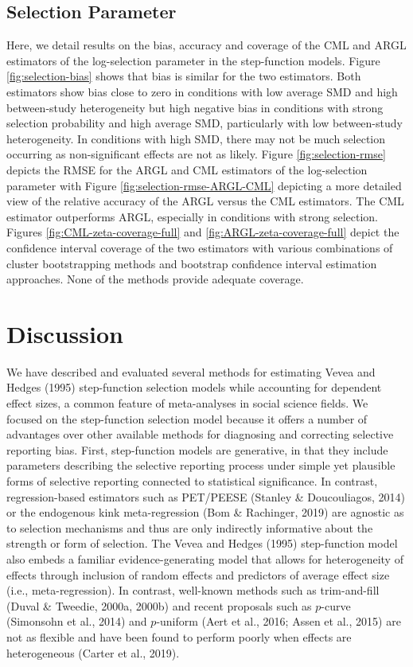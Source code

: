 \documentclass[
  man, donotrepeattitle,floatsintext]{apa7}
\begin{document}
\subsection{Selection Parameter}\label{selection-parameter}

Here, we detail results on the bias, accuracy and coverage of the CML and ARGL estimators of the log-selection parameter in the step-function models. Figure \ref{fig:selection-bias} shows that bias is similar for the two estimators. Both estimators show bias close to zero in conditions with low average SMD and high between-study heterogeneity but high negative bias in conditions with strong selection probability and high average SMD, particularly with low between-study heterogeneity. In conditions with high SMD, there may not be much selection occurring as non-significant effects are not as likely. Figure \ref{fig:selection-rmse} depicts the RMSE for the ARGL and CML estimators of the log-selection parameter with Figure \ref{fig:selection-rmse-ARGL-CML} depicting a more detailed view of the relative accuracy of the ARGL versus the CML estimators. The CML estimator outperforms ARGL, especially in conditions with strong selection. Figures \ref{fig:CML-zeta-coverage-full} and \ref{fig:ARGL-zeta-coverage-full} depict the confidence interval coverage of the two estimators with various combinations of cluster bootstrapping methods and bootstrap confidence interval estimation approaches. None of the methods provide adequate coverage.

\section{Discussion}\label{discussion}

We have described and evaluated several methods for estimating Vevea and Hedges (1995) step-function selection models while accounting for dependent effect sizes, a common feature of meta-analyses in social science fields.
We focused on the step-function selection model because it offers a number of advantages over other available methods for diagnosing and correcting selective reporting bias.
First, step-function models are generative, in that they include parameters describing the selective reporting process under simple yet plausible forms of selective reporting connected to statistical significance.
In contrast, regression-based estimators such as PET/PEESE (Stanley \& Doucouliagos, 2014) or the endogenous kink meta-regression (Bom \& Rachinger, 2019) are agnostic as to selection mechanisms and thus are only indirectly informative about the strength or form of selection.
The Vevea and Hedges (1995) step-function model also embeds a familiar evidence-generating model that allows for heterogeneity of effects through inclusion of random effects and predictors of average effect size (i.e., meta-regression).
In contrast, well-known methods such as trim-and-fill (Duval \& Tweedie, 2000a, 2000b) and recent proposals such as \(p\)-curve (Simonsohn et al., 2014) and \(p\)-uniform (Aert et al., 2016; Assen et al., 2015) are not as flexible and have been found to perform poorly when effects are heterogeneous (Carter et al., 2019).
\end{document}
